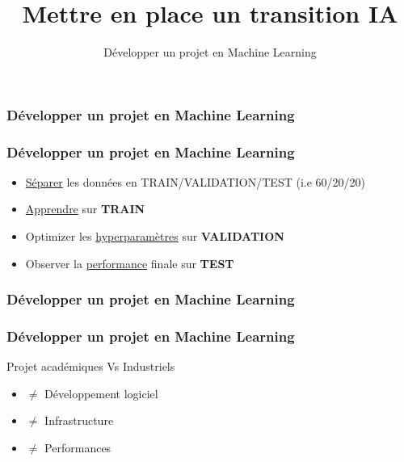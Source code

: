 \documentclass{formation}
\title{Mettre en place un transition IA}
\subtitle{Développer un projet en Machine Learning}
\begin{document}
\maketitle

\begin{frame}
  \frametitle{Développer un projet en Machine Learning}
\end{frame}

\begin{frame}
  \frametitle{Développer un projet en Machine Learning}
  \begin{itemize}
  \item \underline{Séparer} les données en TRAIN/VALIDATION/TEST (i.e 60/20/20)
  \item \underline{Apprendre} sur \textbf{TRAIN}
  \item Optimizer les \underline{hyperparamètres} sur \textbf{VALIDATION}
  \item Observer la \underline{performance} finale sur \textbf{TEST}
  \end{itemize}
\end{frame}

\begin{frame}
  \frametitle{Développer un projet en Machine Learning}
\end{frame}

\begin{frame}
  \frametitle{Développer un projet en Machine Learning}
  Projet académiques Vs Industriels
  \begin{itemize}
  \item $\neq$ Développement logiciel
  \item $\neq$ Infrastructure
  \item $\neq$ Performances
  \end{itemize}
\end{frame}
\end{document}
